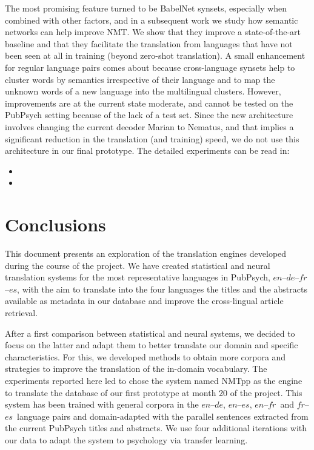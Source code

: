 \documentclass[a4paper,11pt]{article}
\newcommand{\en}{$en$}
\newcommand{\es}{$es$}
\newcommand{\fr}{$fr$}
\newcommand{\de}{$de$}
\begin{document}
The most promising feature turned to be BabelNet synsets, especially when combined with other factors, and in a subsequent work we study how semantic networks can help improve NMT. We show that they improve a state-of-the-art baseline and that they facilitate the translation from languages that have not been seen at all in training (beyond zero-shot translation). A small enhancement for regular language pairs comes about because cross-language synsets help to cluster words by semantics irrespective of their language and to map the unknown words of a new language into the multilingual clusters. However, improvements are at the current state moderate, and cannot be tested on the PubPsych setting because of the lack of a test set. Since the new architecture involves changing the current decoder Marian to Nematus, and that implies a significant reduction in the translation (and training) speed, we do not use this architecture in our final prototype. The detailed experiments can be read in:

\begin{itemize}
 \item[\cite{espanaVanGenabith:IWSLT:2017}] 
 \item[\cite{espanaVanGenabith:LREC:2018}] 
\end{itemize}

\section{Conclusions}
\label{s:conclusions}

This document presents an exploration of the translation engines developed during the course of the project. We have created statistical and neural translation systems for the most representative languages in PubPsych, \en--\de--\fr--\es, with the aim to translate into the four languages the titles and the abstracts available as metadata in our database and improve the cross-lingual article retrieval.

After a first comparison between statistical and neural systems, we decided to focus on the latter and adapt them to better translate our domain and specific characteristics. For this, we developed methods to obtain more corpora and strategies to improve the translation of the in-domain vocabulary. The experiments reported here led to chose the system named NMTpp as the engine to translate the database of our first prototype at month 20 of the project. This system has been trained with general corpora in the  \en--\de, \en--\es, \en--\fr\ and \fr--\es\ language pairs and domain-adapted with the parallel sentences extracted from the current PubPsych titles and abstracts. We use four additional iterations with our data to adapt the system to psychology via transfer learning. 
\end{document}
